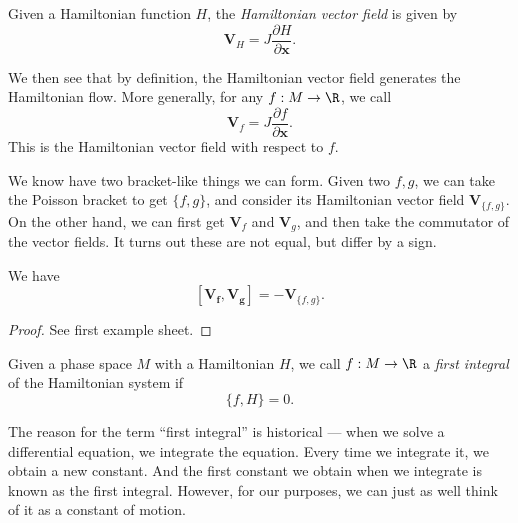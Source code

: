 \documentclass[a4paper]{article}
\begin{document}
\begin{defi}
  Given a Hamiltonian function $H$, the \emph{Hamiltonian vector field} is given by
  \[
    \mathbf{V}_H = J \frac{\partial H}{\partial \mathbf{x}}.
  \]
\end{defi}

We then see that by definition, the Hamiltonian vector field generates the Hamiltonian flow. More generally, for any $f: M \to \R$, we call
\[
  \mathbf{V}_f = J \frac{\partial f}{\partial \mathbf{x}}.
\]
This is the Hamiltonian vector field with respect to $f$.

We know have two bracket-like things we can form. Given two $f, g$, we can take the Poisson bracket to get $\{f, g\}$, and consider its Hamiltonian vector field $\mathbf{V}_{\{f, g\}}$. On the other hand, we can first get $\mathbf{V}_f$ and $\mathbf{V}_g$, and then take the commutator of the vector fields. It turns out these are not equal, but differ by a sign.
\begin{prop}
  We have
  \[
    [\mathbf{V}_\mathbf{f}, \mathbf{V}_\mathbf{g}] = - \mathbf{\mathbf{V}}_{\{f, g\}}.
  \]
\end{prop}

\begin{proof}
  See first example sheet.
\end{proof}

\begin{defi}
  Given a phase space $M$ with a Hamiltonian $H$, we call $f: M \to \R$ a \emph{first integral} of the Hamiltonian system if
  \[
    \{f, H\} = 0.
  \]
\end{defi}
The reason for the term ``first integral'' is historical --- when we solve a differential equation, we integrate the equation. Every time we integrate it, we obtain a new constant. And the first constant we obtain when we integrate is known as the first integral. However, for our purposes, we can just as well think of it as a constant of motion.
\end{document}
